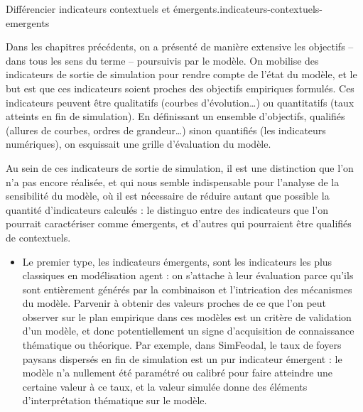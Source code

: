 \bigskip 
\begin{encadre}{Différencier indicateurs contextuels et émergents.}{indicateurs-contextuels-emergents}
		\renewcommand{\thempfootnote}{\alph{mpfootnote}}
	
Dans les chapitres précédents, on a présenté de manière extensive les objectifs -- dans tous les sens du terme -- poursuivis par le modèle.
On mobilise des indicateurs de sortie de simulation pour rendre compte de l'état du modèle, et le but est que ces indicateurs soient proches des objectifs empiriques formulés.
Ces indicateurs peuvent être qualitatifs (courbes d'évolution\ldots) ou quantitatifs (taux atteints en fin de simulation).
En définissant un ensemble d'objectifs, qualifiés (allures de courbes, ordres de grandeur\ldots) sinon quantifiés (les indicateurs numériques), on esquissait une grille d'évaluation du modèle.

Au sein de ces indicateurs de sortie de simulation, il est une distinction que l'on n’a pas encore réalisée, et qui nous semble indispensable pour l'analyse de la sensibilité du modèle, où il est nécessaire de réduire autant que possible la quantité d'indicateurs calculés : le distinguo entre des indicateurs que l'on pourrait caractériser comme \og émergents\fg{}, et d'autres qui pourraient être qualifiés de \og contextuels\fg{}.

\begin{itemize}
	\item Le premier type, les indicateurs émergents, sont les indicateurs les plus classiques en modélisation agent : on s'attache à leur évaluation parce qu'ils sont entièrement générés par la combinaison et l'intrication des mécanismes du modèle.
	Parvenir à obtenir des valeurs proches de ce que l'on peut observer sur le plan empirique dans ces modèles est un critère de validation d'un modèle, et donc potentiellement un signe d'acquisition de connaissance thématique ou théorique.
	Par exemple, dans SimFeodal, le taux de foyers paysans dispersés en fin de simulation est un pur indicateur émergent : le modèle n'a nullement été paramétré ou calibré pour faire atteindre une certaine valeur à ce taux, et la valeur simulée donne des éléments d'interprétation thématique sur le modèle.
	

\end{itemize}
\end{encadre}
